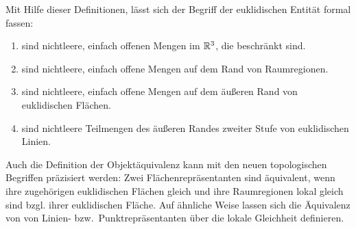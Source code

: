 %     
%     
%     
%     
%     
%     
%
    Mit
    Hilfe dieser Definitionen, lässt sich der Begriff der euklidischen Entität formal fassen:
    \begin{enumerate}
        \item {} sind nichtleere, einfach offenen Mengen im $\mathbb{R}^3$, die beschränkt sind.
        \item {} sind nichtleere, einfach offene Mengen auf dem Rand von Raumregionen.
        \item {} sind nichtleere, einfach offene Mengen auf dem äußeren Rand von euklidischen Flächen.
        \item {} sind nichtleere Teilmengen des äußeren Randes zweiter Stufe von euklidischen Linien.
    \end{enumerate}
    Auch
    die Definition der Objektäquivalenz kann mit den neuen topologischen Begriffen präzisiert werden:
    Zwei Flächenrepräsentanten sind äquivalent, wenn ihre zugehörigen euklidischen Flächen gleich und ihre Raumregionen lokal gleich sind bzgl. ihrer euklidischen Fläche. Auf ähnliche Weise lassen sich die Äquivalenz von von Linien- bzw.\ Punktrepräsentanten über die lokale Gleichheit definieren.
    
